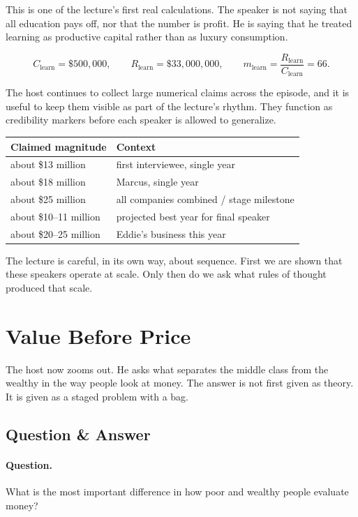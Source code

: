 This is one of the lecture's first real calculations. The speaker is not saying that all education pays off, nor that the number is profit. He is saying that he treated learning as productive capital rather than as luxury consumption.

\begin{equation}
C_{\text{learn}}=\$500{,}000,
\qquad
R_{\text{learn}}=\$33{,}000{,}000,
\qquad
m_{\text{learn}}=\frac{R_{\text{learn}}}{C_{\text{learn}}}=66.
\end{equation}

The host continues to collect large numerical claims across the episode, and it is useful to keep them visible as part of the lecture's rhythm. They function as credibility markers before each speaker is allowed to generalize.

\begin{table}
\centering
\begin{tabular}{ll}
Claimed magnitude & Context \\
\hline
about \$13 million & first interviewee, single year \\
about \$18 million & Marcus, single year \\
about \$25 million & all companies combined / stage milestone \\
about \$10--11 million & projected best year for final speaker \\
about \$20--25 million & Eddie's business this year \\
\end{tabular}
\end{table}

The lecture is careful, in its own way, about sequence. First we are shown that these speakers operate at scale. Only then do we ask what rules of thought produced that scale.

\section{Value Before Price}

The host now zooms out. He asks what separates the middle class from the wealthy in the way people look at money. The answer is not first given as theory. It is given as a staged problem with a bag.

\subsection{Question \& Answer}

\paragraph{Question.} What is the most important difference in how poor and wealthy people evaluate money?


